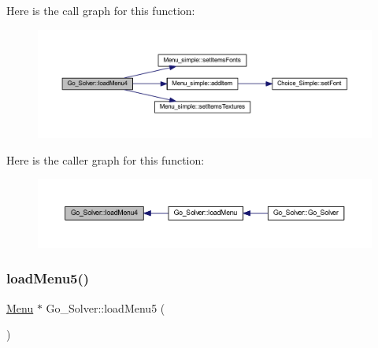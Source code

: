 Here is the call graph for this function\+:
\nopagebreak
\begin{figure}[H]
\begin{center}
\leavevmode
\includegraphics[width=350pt]{class_go___solver_a99b82aef6960441ba24e3b28c7ec9ad5_cgraph}
\end{center}
\end{figure}
Here is the caller graph for this function\+:
\nopagebreak
\begin{figure}[H]
\begin{center}
\leavevmode
\includegraphics[width=350pt]{class_go___solver_a99b82aef6960441ba24e3b28c7ec9ad5_icgraph}
\end{center}
\end{figure}
\mbox{\label{class_go___solver_a480bbc610bbc9bb3b1c675d69128d1fd}} 
\subsubsection{\texorpdfstring{load\+Menu5()}{loadMenu5()}}
{\footnotesize\ttfamily \hyperlink{class_menu}{Menu} $\ast$ Go\+\_\+\+Solver\+::load\+Menu5 (\begin{DoxyParamCaption}{ }\end{DoxyParamCaption})\hspace{0.3cm}{\ttfamily [static]}}

